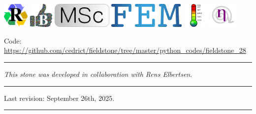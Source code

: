 \includegraphics[height=1.25cm]{images/pictograms/replication}
\includegraphics[height=1.25cm]{images/pictograms/benchmark}
\includegraphics[height=1.25cm]{images/pictograms/msc}
\includegraphics[height=1.25cm]{images/pictograms/FEM}
\includegraphics[height=1.25cm]{images/pictograms/temperature}
\includegraphics[height=1.25cm]{images/pictograms/nonlinear}


%

\begin{center}
\inpython
{\small Code: \url{https://github.com/cedrict/fieldstone/tree/master/python_codes/fieldstone_28}}
\end{center}

\par\noindent\rule{\textwidth}{0.4pt}

{\sl This stone was developed in collaboration with Rens Elbertsen}. 

\par\noindent\rule{\textwidth}{0.4pt}

Last revision: September 26th, 2025.

\par\noindent\rule{\textwidth}{0.4pt}

